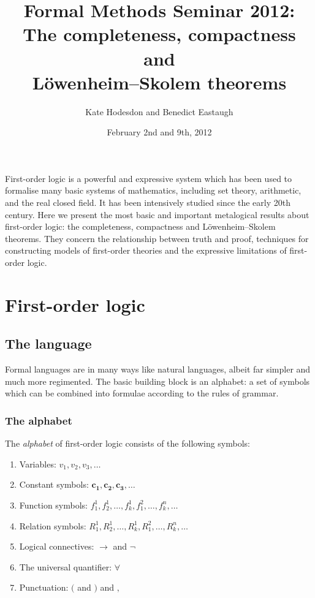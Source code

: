 \documentclass[10pt, a4paper, oneside]{article}
\title{Formal Methods Seminar 2012:\\
       The completeness, compactness and\\
       Löwenheim--Skolem theorems}
\author{Kate Hodesdon and Benedict Eastaugh}
\date{February 2nd and 9th, 2012}
\theoremstyle{definition}
\theoremstyle{remark}
\theoremstyle{plain}
\begin{document}
\maketitle

First-order logic is a powerful and expressive system which has been used to
formalise many basic systems of mathematics, including set theory, arithmetic,
and the real closed field. It has been intensively studied since the early 20th
century. Here we present the most basic and important metalogical results about
first-order logic: the completeness, compactness and Löwenheim--Skolem
theorems. They concern the relationship between truth and proof, techniques for
constructing models of first-order theories and the expressive limitations of
first-order logic.


\section{First-order logic}

\subsection{The language}

Formal languages are in many ways like natural languages, albeit far simpler and
much more regimented. The basic building block is an alphabet: a set of symbols
which can be combined into formulae according to the rules of grammar.

\subsubsection{The alphabet}

The \emph{alphabet} of first-order logic consists of the following symbols:

\begin{enumerate}
    \item Variables: $v_1, v_2, v_3, \dotsc$
    \item Constant symbols: $\mathbf{c_1}, \mathbf{c_2}, \mathbf{c_3}, \dotsc$
    \item Function symbols: $f^1_1, f^1_2, \dotsc, f^1_k, f^2_1, \dotsc, f^n_k,
        \dotsc$
    \item Relation symbols: $R^1_1, R^1_2, \dotsc, R^1_k, R^2_1, \dotsc, R^n_k,
        \dotsc$
    \item Logical connectives: $\rightarrow$ and $\neg$
    \item The universal quantifier: $\forall$
    \item Punctuation: $($ and $)$ and $,$
\end{enumerate}
\end{document}
